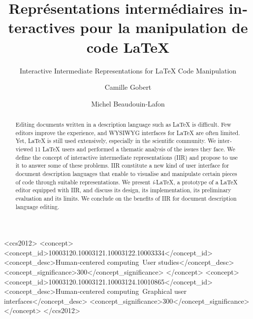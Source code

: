 \documentclass[sigconf]{acmart}
\DeclareRobustCommand{\iLaTeX}{\mbox{{\large{\itshape i}-\hspace{-0.25mm}}\LaTeX{}}}
\newcommand{\en}[1]{\foreignlanguage{english}{#1}}
\newcommand{\fr}[1]{\foreignlanguage{french}{#1}}
\begin{document}
\sloppy

\def\titreFR{Représentations intermédiaires interactives pour la manipulation de code \LaTeX{}}
\def\titreEN{Interactive Intermediate Representations for \LaTeX{} Code Manipulation}
\def\titreSHORT{} 

\title[\fr{\titreSHORT}]{\fr{\titreFR}}
\subtitle{\en{\titreEN}}

\author{Camille Gobert}

\author{Michel Beaudouin-Lafon}

\begin{abstract} 
\en{
Editing documents written in a description language such as \LaTeX{} is difficult. Few editors improve the experience, and WYSIWYG interfaces for \LaTeX{} are often limited. Yet, \LaTeX{} is still used extensively, especially in the scientific community. We interviewed 11 \LaTeX{} users and performed a thematic analysis of the issues they face. We define the concept of interactive intermediate representations (IIR) and propose to use it to answer some of these problems. IIR constitute a new kind of user interface for document description languages that enable to visualise and manipulate certain pieces of code through suitable representations. We present \iLaTeX{}, a prototype of a \LaTeX{} editor equipped with IIR, and discuss its design, its implementation, its preliminary evaluation and its limits. We conclude on the benefits of IIR for document description language editing.
}
\end{abstract}

\begin{CCSXML}
<ccs2012>
    <concept>
        <concept_id>10003120.10003121.10003122.10003334</concept_id>
        <concept_desc>Human-centered computing~User studies</concept_desc>
        <concept_significance>300</concept_significance>
    </concept>
    <concept>
        <concept_id>10003120.10003121.10003124.10010865</concept_id>
        <concept_desc>Human-centered computing~Graphical user interfaces</concept_desc>
        <concept_significance>300</concept_significance>
    </concept>
</ccs2012>
\end{CCSXML}

\end{document}
